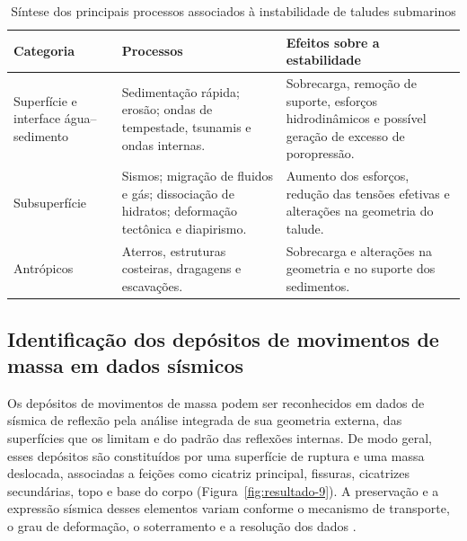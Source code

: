 \begin{table}[htbp]
  \centering
  \caption[Síntese dos principais processos associados à instabilidade de taludes submarinos]{Síntese dos principais processos associados à instabilidade de taludes submarinos}
  \label{tab:resultado-1}
  \small
  \setlength{\tabcolsep}{2.5pt}
  \begin{tabularx}{\textwidth}{>{\raggedright\arraybackslash}X >{\centering\arraybackslash}X >{\centering\arraybackslash}X}
    \toprule
    \textbf{Categoria} & \textbf{Processos} & \textbf{Efeitos sobre a estabilidade} \\
    \midrule
    Superfície e interface água--sedimento & Sedimentação rápida; erosão; ondas de tempestade, tsunamis e ondas internas. & Sobrecarga, remoção de suporte, esforços hidrodinâmicos e possível geração de excesso de poropressão. \\
    Subsuperfície & Sismos; migração de fluidos e gás; dissociação de hidratos; deformação tectônica e diapirismo. & Aumento dos esforços, redução das tensões efetivas e alterações na geometria do talude. \\
    Antrópicos & Aterros, estruturas costeiras, dragagens e escavações. & Sobrecarga e alterações na geometria e no suporte dos sedimentos. \\
    \bottomrule
  \end{tabularx}
\end{table}

\subsection{Identificação dos depósitos de movimentos de massa em dados sísmicos}\label{sec:2-3-3}

Os depósitos de movimentos de massa podem ser reconhecidos em dados de sísmica de reflexão pela análise integrada de sua geometria externa, das superfícies que os limitam e do padrão das reflexões internas. De modo geral, esses depósitos são constituídos por uma superfície de ruptura e uma massa deslocada, associadas a feições como cicatriz principal, fissuras, cicatrizes secundárias, topo e base do corpo (Figura~\ref{fig:resultado-9}). A preservação e a expressão sísmica desses elementos variam conforme o mecanismo de transporte, o grau de deformação, o soterramento e a resolução dos dados \cite{hampton1996,posamentier2011}.

